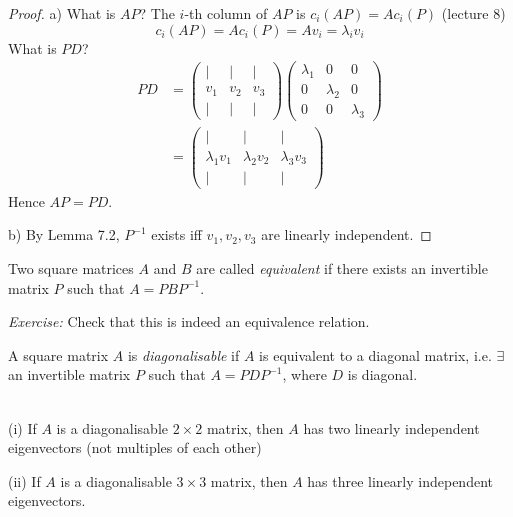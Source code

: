 \documentclass[10pt]{scrartcl}
\begin{document}
\begin{proof}
	a) What is $AP$? The $i$-th column of $AP$ is $c_i(AP) = Ac_i(P) $ (lecture 8) 
	\[
  c_i(AP) = Ac_i(P) = Av_i = \lambda_iv_i
\]
What is $PD$?
\begin{align*}
  PD &= \begin{pmatrix}
 | & | & | \\ v_1 & v_2 & v_3 \\ | & | & |	
 \end{pmatrix}\begin{pmatrix}
 \lambda_1 & 0 & 0\\ 0 & \lambda_2 & 0\\ 0 & 0 & \lambda_3	
 \end{pmatrix}\\
 &= \begin{pmatrix}
 | & | & | \\ \lambda_1v_1 & \lambda_2v_2 & \lambda_3v_3 \\ | & | & |	
 \end{pmatrix}
\end{align*}
Hence $AP = PD$.

b) By Lemma 7.2, $P^{-1}$ exists iff $v_1,v_2,v_3$ are linearly independent.
\end{proof}\vsp

\begin{definition}
Two square matrices $A$ and $B$ are called \emph{equivalent} if there exists an invertible matrix $P$ such that $A = PBP^{-1}$. 
\end{definition}

\emph{Exercise:} Check that this is indeed an equivalence relation.\\

\begin{definition}
A square matrix $A$ is \emph{diagonalisable} if $A$ is equivalent to a diagonal matrix, i.e. $\exists$ an invertible matrix $P$ such that $A = PDP^{-1}$, where $D$ is diagonal. 
\end{definition}\vsp

\begin{proposition}~\\[.1cm]
(i) If $A$ is a diagonalisable $2 \times 2$ matrix, then $A$ has two linearly independent eigenvectors (not multiples of each other)

(ii) If $A$ is a diagonalisable $3 \times 3$ matrix, then $A$ has three linearly independent eigenvectors.  	
\end{proposition}
\end{document}
